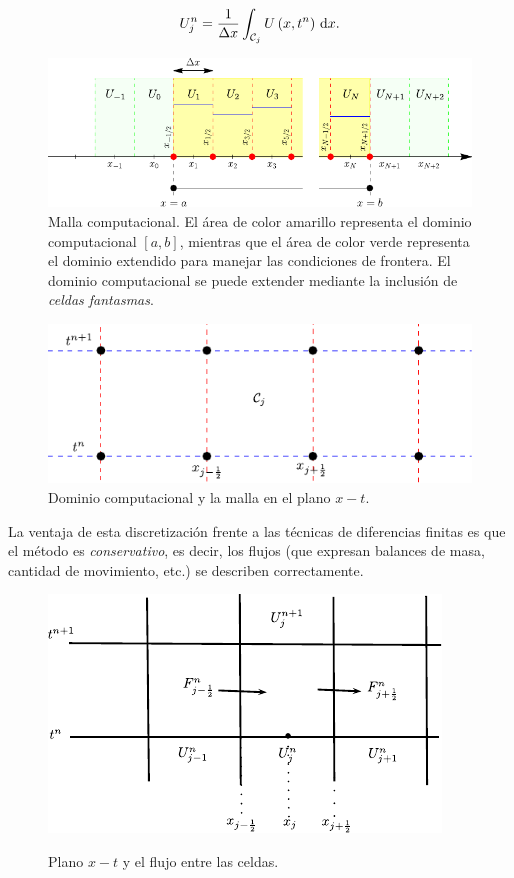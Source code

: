 \begin{equation*}
	U^{n}_{j}=
	\dfrac{1}{\Delta x}
	\int_{\mathcal{C}_{j}}
	U
	\left(x,t^{n}\right)
	\dl x.
\end{equation*}

\begin{figure}[ht!]
	\centering
	\includegraphics[width=.5\paperwidth]{computationalgrid}
	\caption{Malla computacional.
		El área de color amarillo representa el dominio computacional
		$\left[a,b\right]$, mientras que el área de color verde
		representa el dominio extendido para manejar las condiciones de
		frontera.
		El dominio computacional se puede extender mediante la inclusión
		de \emph{celdas fantasmas}.
	}
	\label{fig:piecewise}
\end{figure}

\begin{figure}[ht!]
	\centering
	\includegraphics[width=.5\paperwidth]{computationaldomainfinitevolume}
	\caption{Dominio computacional y la malla en el plano $x-t$.}
	\label{fig:computationaldomainfinitevolume}
\end{figure}

La ventaja de esta discretización frente a las técnicas de
diferencias finitas es que el método es \emph{conservativo}, es
decir, los flujos (que expresan balances de masa, cantidad de
movimiento, etc.) se describen correctamente.

\begin{figure}[ht!]
	\centering
	\includegraphics[width=.5\paperwidth]{finitevolumediagram}
	\label{fig:finitevolumediagram}
	\caption{Plano $x-t$ y el flujo entre las celdas.}
\end{figure}


